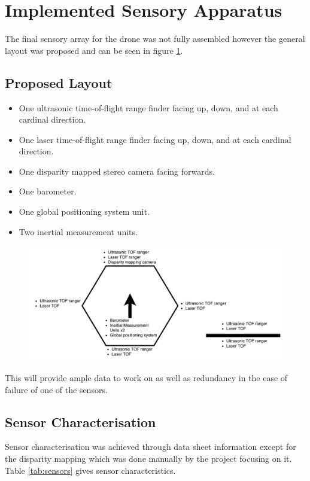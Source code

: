 \section{Implemented Sensory Apparatus}
The final sensory array for the drone was not fully assembled however the general layout was proposed and can be seen in figure \ref{fig:sensordiagram}.

\subsection{Proposed Layout}
\begin{itemize}
\item One ultrasonic time-of-flight range finder facing up, down, and at each cardinal direction.
\item One laser time-of-flight range finder facing up, down, and at each cardinal direction.
\item One disparity mapped stereo camera facing forwards.
\item One barometer.
\item One global positioning system unit.
\item Two inertial measurement units.
\end{itemize}

\begin{figure}[ht]
	\centering
	\includegraphics[width=\textwidth]{sensordiagram.pdf}
	\label{fig:sensordiagram}
\end{figure}

This will provide ample data to work on as well as redundancy in the case of failure of one of the sensors.


\subsection{Sensor Characterisation}
Sensor characterisation was achieved through data sheet information except for the disparity mapping which was done manually by the project focusing on it.
Table \ref{tab:sensors} gives sensor characteristics.

